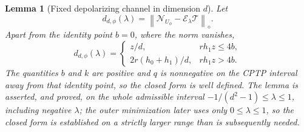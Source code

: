 \documentclass[11pt,a4paper]{article}
\newtheorem{lemma}{Lemma}
\theoremstyle{remark}
\newcommand{\cE}{\mathcal{E}}
\newcommand{\cN}{\mathcal{N}}
\newcommand{\cT}{\mathcal{T}}
\newcommand{\diamondnorm}[1]{\left\lVert #1\right\rVert_{\diamond}}
\begin{document}
\begin{lemma}[Fixed depolarizing channel in dimension $d$]
\label{lem:fixed}
Let
\[
 d_{d,\phi}(\lambda)
 =\diamondnorm{\cN_{U_\phi}-\cE_\lambda\cT}.
\]
Apart from the identity point $b=0$, where the norm vanishes,
\begin{equation}
 d_{d,\phi}(\lambda)=
 \begin{cases}
  z/d, & rh_1z\leq4b,\\[2pt]
  2r(h_0+h_1)/d, & rh_1z>4b.
 \end{cases}
 \label{eq:fixed-norm}
\end{equation}
The quantities $b$ and $k$ are positive and $q$ is nonnegative on the CPTP
interval away from that identity point, so the closed form is well defined.
The lemma is asserted, and proved, on the \emph{whole} admissible interval
$-1/(d^2-1)\leq\lambda\leq1$, including negative $\lambda$; the outer
minimization later uses only $0\leq\lambda\leq1$, so the closed form is
established on a strictly larger range than is subsequently needed.
\end{lemma}
\end{document}
